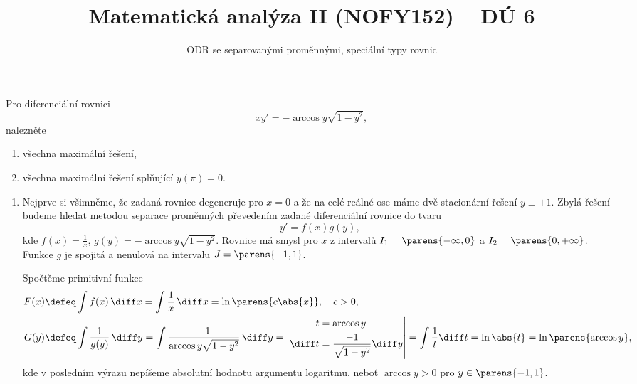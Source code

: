 \documentclass[answers]{exam}
\title{\vspace{-3ex}Matematická analýza II (NOFY152) – DÚ 6}
\author{ODR se separovanými proměnnými, speciální typy rovnic}
\date{\vspace{-5ex}}
\begin{document}
\maketitle

\begin{questions}	
  \question Pro diferenciální rovnici
  \begin{equation*}
    x y'
    =
    - \arccos y \sqrt{1 - y^2},
  \end{equation*}
  nalezněte
	\begin{enumerate}[label=(\roman*)]
		\item všechna maximální řešení,
		\item všechna maximální řešení splňující $y(\pi) = 0$.
	\end{enumerate}
	
  \begin{solution}
	\begin{enumerate}[label=(\roman*)]
		\item
			Nejprve si všimněme, že zadaná rovnice degeneruje pro $x = 0$ a že na celé reálné ose máme dvě stacionární řešení $y \equiv \pm1$. Zbylá řešení budeme hledat metodou separace proměnných převedením zadané diferenciální rovnice do tvaru
	  	\begin{equation*}
	    y'
	    =
	    f(x) g(y), 	
	  	\end{equation*}
	  	kde $f(x) = \frac{1}{x}$, $g(y) = - \arccos y \sqrt{1 - y^2}$. Rovnice má smysl pro $x$ z intervalů $I_1 = \parens{-\infty, 0}$ a $I_2 = \parens{0, +\infty}$.  Funkce $g$ je spojitá a nenulová na intervalu $J = \parens{-1, 1}$.
	  	
	  	Spočtěme primitivní funkce
	  	\begin{align*}
	  		F(x)
	  		&\defeq
	  		\int f(x) \, \diff x
	  		=
	  		\int \frac{1}{x} \, \diff x
	  		=
	  		\ln \parens{c \abs{x}}, \quad c > 0,
	  		\\
	  		G(y)
	  		&\defeq
	  		\int \frac{1}{g(y)} \, \diff y
	  		=
	  		\int \frac{-1}{\arccos y \sqrt{1 - y^2}} \, \diff y
	  		=
	      \left| 
	        \begin{aligned}
	          t &= \arccos y
	          \\
	          \diff t &= \frac{-1}{\sqrt{1 - y^2}} \diff y
	        \end{aligned}
	      \right|	  		
	  		=
	      \int \frac{1}{t} \diff t
	      =
	      \ln \abs{t}
	      =
	      \ln \parens{\arccos y},
	  	\end{align*}
	  	kde v posledním výrazu nepíšeme absolutní hodnotu argumentu logaritmu, neboť $\arccos y > 0$ pro $y \in \parens{-1, 1}$.
	  	

\end{enumerate}
\end{solution}
\end{questions}
\end{document}
